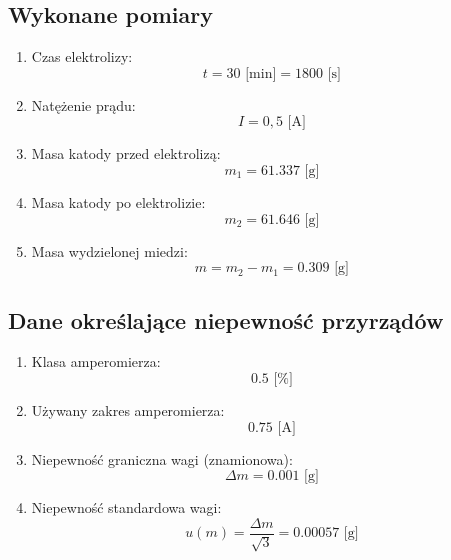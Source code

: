 \documentclass[a4paper,12pts]{article}
\begin{document}
	\subsection{Wykonane pomiary}
	
	\begin{enumerate}
		\item Czas elektrolizy:
		\begin{equation}
		t = 30 \textrm{ [min]} = 1800 \textrm{ [s]}
		\end{equation}
		
		\item Natężenie prądu:
		\begin{equation}
		I = 0,5 \textrm{ [A]}
		\end{equation}
		
		\item Masa katody przed elektrolizą:
		\begin{equation}
		m_{1} = 61.337 \textrm{ [g]}
		\end{equation}
		
		\item Masa katody po elektrolizie:
		\begin{equation}
		m_{2} = 61.646 \textrm{ [g]}
		\end{equation}
		
		\item Masa wydzielonej miedzi:
		\begin{equation}
		m = m_{2} - m_{1} = 0.309 \textrm{ [g]}
		\end{equation}
	\end{enumerate}
	
	
	\newpage
	\subsection{Dane określające niepewność przyrządów}
	
	\begin{enumerate}
		\item Klasa amperomierza: 
		$$0.5 \textrm{ [\%]}$$
		\item Używany zakres amperomierza: 
		$$0.75 \textrm{ [A]}$$
		\item Niepewność graniczna wagi (znamionowa): 
		$$\Delta m = 0.001 \textrm{ [g]}$$
		\item Niepewność standardowa wagi: 
		$$u(m) = \frac{\Delta m}{\sqrt{3}} = 0.00057 \textrm{ [g]}$$
	\end{enumerate}
	
\end{document}
